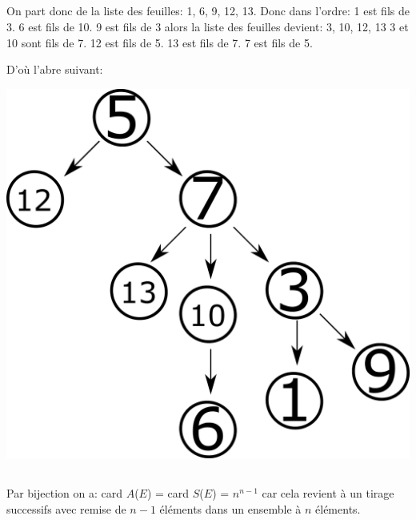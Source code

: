 \documentclass{article}
\begin{document}
		\subsection{}
		
			On part donc de la liste des feuilles: 1, 6, 9, 12, 13.
			Donc dans l'ordre:
			1 est fils de 3.
			6 est fils de 10.
			9 est fils de 3 alors la liste des feuilles devient: 3, 10, 12, 13
			3 et 10 sont fils de 7.
			12 est fils de 5.
			13 est fils de 7.
			7 est fils de 5.
			
			D'où l'abre suivant:
			
			\includegraphics[scale=0.1]{IMG/PNG/29.png}
		
		\subsection{}
			
			\begin{code}
			\end{code}
		
		\subsection{}
		
		\subsection{}
		
			Par bijection on a: card $A$($E$) = card $S$($E$) = $n^{n-1}$ car cela revient à un tirage successifs avec remise de $n - 1$ éléments dans un ensemble à $n$ éléments.
		
\end{document}
